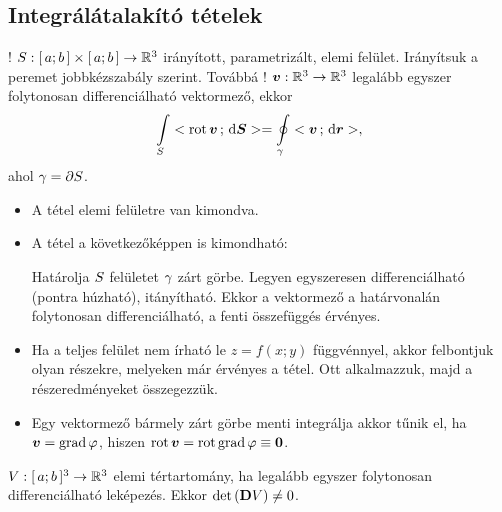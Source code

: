 \documentclass[main.tex]{subfiles}
\begin{document}
\subsection{Integrálátalakító tételek}


! ${S} :
  [\, a; b \,] \times [\, a; b \,]
  \rightarrow \mathbb{R}^3$ irányított, parametrizált,
elemi felület. Irányítsuk a peremet jobbkézszabály szerint.
Továbbá ! $\boldsymbol{v} : \mathbb{R}^3 \rightarrow \mathbb{R}^3$
legalább egyszer folytonosan differenciálható vektormező,
ekkor
\begin{equation*}
  \int \limits_{S}
  < \operatorname{rot} \boldsymbol{v} \, ; \, \mathrm{d} \boldsymbol{S} >
  =
  \oint \limits_{{\gamma}}
  < \boldsymbol{v} \, ; \, \mathrm{d} \boldsymbol{r} >,
\end{equation*}
ahol ${\gamma} = \partial {S}$.



\begin{itemize}
  \item A tétel elemi felületre van kimondva.


  \item A tétel a következőképpen is kimondható:

        Határolja ${S}$ felületet ${\gamma}$
        zárt görbe. Legyen egyszeresen differenciálható
        (pontra húzható), itányítható. Ekkor a vektormező
        a határvonalán folytonosan differenciálható, a
        fenti összefüggés érvényes.


  \item Ha a teljes felület nem írható le $z = f(x;y)$
        függvénnyel, akkor felbontjuk olyan részekre,
        melyeken már érvényes a tétel. Ott alkalmazzuk,
        majd a részeredményeket összegezzük.

  \item Egy vektormező bármely zárt görbe menti integrálja
        akkor tűnik el, ha $\boldsymbol{v} = \operatorname{grad} \varphi$,
        hiszen $\operatorname{rot} \boldsymbol{v} = \operatorname{rot} \operatorname{grad} \varphi \equiv \boldsymbol{0}$.
\end{itemize}




${V} : [\, a; b \,]^3 \rightarrow \mathbb{R}^3$
elemi tértartomány, ha legalább egyszer folytonosan
differenciálható leképezés. Ekkor
$\det \left( \mathbf{D} {V} \right) \neq 0$.
\end{document}
